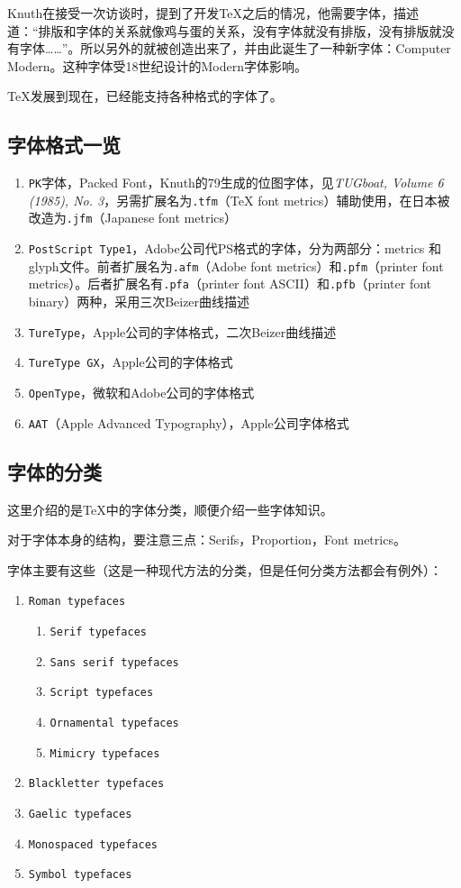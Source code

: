\documentclass{article}
\begin{document}
Knuth在接受一次访谈时，提到了开发\TeX 之后的情况，他需要字体，描述道：“排版和字体的关系就像鸡与蛋的关系，没有字体就没有排版，没有排版就没有字体……”。所以另外的\MF 就被创造出来了，并由此诞生了一种新字体：Computer Modern。这种字体受18世纪设计的Modern字体影响。

\TeX 发展到现在，已经能支持各种格式的字体了。
\subsection{字体格式一览}
\begin{enumerate}
\item \verb!PK!字体，Packed Font，Knuth的\MF 79生成的位图字体，见\textit{TUGboat, Volume 6 (1985), No. 3}，另需扩展名为\verb!.tfm!（\TeX{} font metrics）辅助使用，在日本被改造为\verb!.jfm!（Japanese font metrics）
\item \verb!PostScript Type1!，Adobe公司代PS格式的字体，分为两部分：metrics 和 glyph文件。前者扩展名为\verb!.afm!（Adobe font metrics）和\verb!.pfm!（printer font metrics）。后者扩展名有\verb!.pfa!（printer font ASCII）和\verb!.pfb!（printer font binary）两种，采用三次Beizer曲线描述
\item \verb!TureType!，Apple公司的字体格式，二次Beizer曲线描述
\item \verb!TureType GX!，Apple公司的字体格式
\item \verb!OpenType!，微软和Adobe公司的字体格式
\item \verb!AAT!（Apple Advanced Typography），Apple公司字体格式
\end{enumerate}
\subsection{字体的分类}
这里介绍的是\TeX 中的字体分类，顺便介绍一些字体知识。

对于字体本身的结构，要注意三点：Serifs，Proportion，Font metrics。

字体主要有这些（这是一种现代方法的分类，但是任何分类方法都会有例外）：
\begin{enumerate}
\item \verb!Roman typefaces!
	\begin{enumerate}
	\item \verb!Serif typefaces!
	\item \verb!Sans serif typefaces!
	\item \verb!Script typefaces!
	\item \verb!Ornamental typefaces!
	\item \verb!Mimicry typefaces!
	\end{enumerate}
\item \verb!Blackletter typefaces!
\item \verb!Gaelic typefaces!
\item \verb!Monospaced typefaces!
\item \verb!Symbol typefaces!
\end{enumerate}
\end{document}
